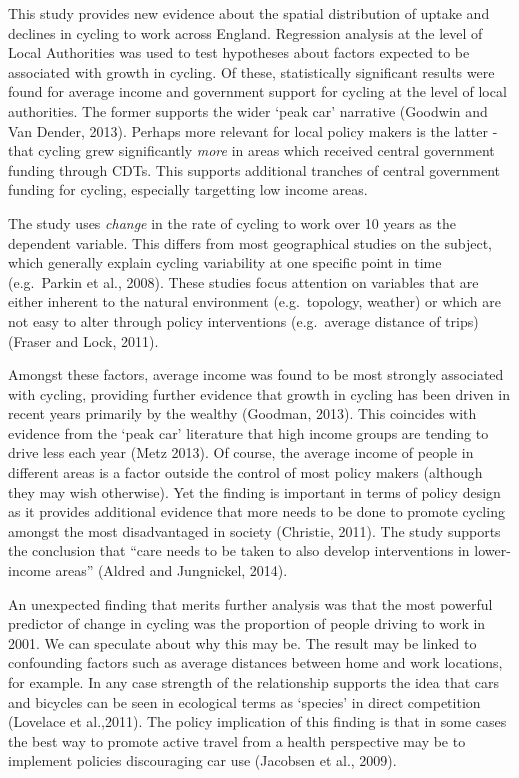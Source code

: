 This study provides new evidence about the spatial distribution of
uptake and declines in cycling to work across England. Regression
analysis at the level of Local Authorities was used to test hypotheses
about factors expected to be associated with growth in cycling. Of
these, statistically significant results were found for average income
and government support for cycling at the level of local authorities.
The former supports the wider `peak car' narrative (Goodwin and Van
Dender, 2013). Perhaps more relevant for local policy makers is the
latter - that cycling grew significantly \emph{more} in areas which
received central government funding through CDTs. This supports
additional tranches of central government funding for cycling,
especially targetting low income areas.

The study uses \emph{change} in the rate of cycling to work over 10
years as the dependent variable. This differs from most geographical
studies on the subject, which generally explain cycling variability at
one specific point in time (e.g.~Parkin et al., 2008). These studies
focus attention on variables that are either inherent to the natural
environment (e.g.~topology, weather) or which are not easy to alter
through policy interventions (e.g.~average distance of trips) (Fraser
and Lock, 2011).

Amongst these factors, average income was found to be most strongly
associated with cycling, providing further evidence that growth in
cycling has been driven in recent years primarily by the wealthy
(Goodman, 2013). This coincides with evidence from the `peak car'
literature that high income groups are tending to drive less each year
(Metz 2013). Of course, the average income of people in different areas
is a factor outside the control of most policy makers (although they may
wish otherwise). Yet the finding is important in terms of policy design
as it provides additional evidence that more needs to be done to promote
cycling amongst the most disadvantaged in society (Christie, 2011). The
study supports the conclusion that ``care needs to be taken to also
develop interventions in lower-income areas'' (Aldred and Jungnickel,
2014).

An unexpected finding that merits further analysis was that the most
powerful predictor of change in cycling was the proportion of people
driving to work in 2001. We can speculate about why this may be. The
result may be linked to confounding factors such as average distances
between home and work locations, for example. In any case strength of
the relationship supports the idea that cars and bicycles can be seen in
ecological terms as `species' in direct competition (Lovelace et
al.,2011). The policy implication of this finding is that in some cases
the best way to promote active travel from a health perspective may be
to implement policies discouraging car use (Jacobsen et al., 2009).

